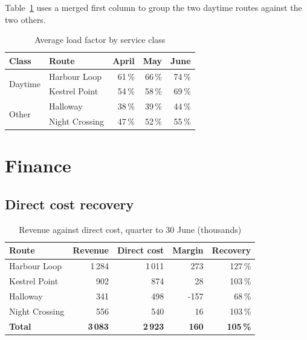 \documentclass[11pt,a4paper]{report}
\begin{document}
Table~\ref{tab:load} uses a merged first column to group the two daytime routes
against the two others.

\begin{table}[ht]
  \centering
  \caption{Average load factor by service class}
  \label{tab:load}
  \begin{tabular}{llrrr}
    \toprule
    Class & Route & April & May & June \\
    \midrule
    \multirow{2}{*}{Daytime}
          & Harbour Loop   & 61\,\% & 66\,\% & 74\,\% \\
          & Kestrel Point  & 54\,\% & 58\,\% & 69\,\% \\
    \midrule
    \multirow{2}{*}{Other}
          & Halloway       & 38\,\% & 39\,\% & 44\,\% \\
          & Night Crossing & 47\,\% & 52\,\% & 55\,\% \\
    \bottomrule
  \end{tabular}
\end{table}

\chapter{Finance}

\section{Direct cost recovery}

\begin{table}[ht]
  \centering
  \caption{Revenue against direct cost, quarter to 30 June (thousands)}
  \label{tab:recovery}
  \begin{tabular}{lrrrr}
    \toprule
    Route          & Revenue & Direct cost & Margin & Recovery \\
    \midrule
    Harbour Loop   & 1\,284 & 1\,011 & 273  & 127\,\% \\
    Kestrel Point  &   902  &   874  &  28  & 103\,\% \\
    Halloway       &   341  &   498  & -157 &  68\,\% \\
    Night Crossing &   556  &   540  &  16  & 103\,\% \\
    \midrule
    \textbf{Total} & \textbf{3\,083} & \textbf{2\,923} & \textbf{160}
                   & \textbf{105\,\%} \\
    \bottomrule
  \end{tabular}
\end{table}
\end{document}
